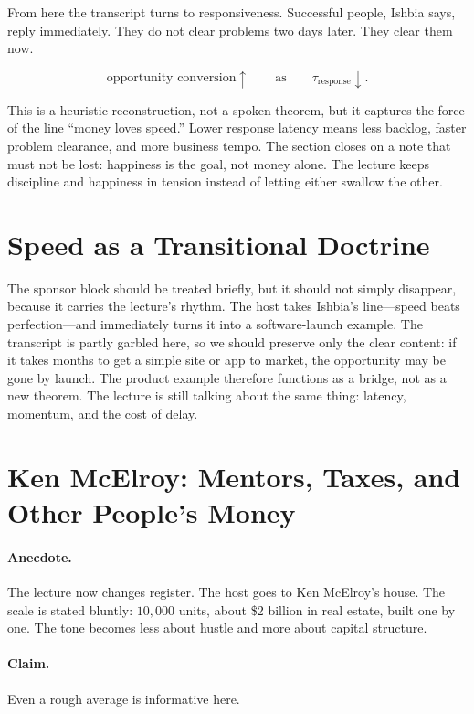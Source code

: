 From here the transcript turns to responsiveness. Successful people, Ishbia says, reply immediately. They do not clear problems two days later. They clear them now.

\begin{equation}
\text{opportunity conversion} \uparrow \qquad \text{as} \qquad \tau_{\text{response}} \downarrow.
\end{equation}

This is a heuristic reconstruction, not a spoken theorem, but it captures the force of the line ``money loves speed.'' Lower response latency means less backlog, faster problem clearance, and more business tempo. The section closes on a note that must not be lost: happiness is the goal, not money alone. The lecture keeps discipline and happiness in tension instead of letting either swallow the other.

\section{Speed as a Transitional Doctrine}

The sponsor block should be treated briefly, but it should not simply disappear, because it carries the lecture's rhythm. The host takes Ishbia's line---speed beats perfection---and immediately turns it into a software-launch example. The transcript is partly garbled here, so we should preserve only the clear content: if it takes months to get a simple site or app to market, the opportunity may be gone by launch. The product example therefore functions as a bridge, not as a new theorem. The lecture is still talking about the same thing: latency, momentum, and the cost of delay.

\section{Ken McElroy: Mentors, Taxes, and Other People's Money}

\paragraph{Anecdote.} The lecture now changes register. The host goes to Ken McElroy's house. The scale is stated bluntly: \(10{,}000\) units, about \$2 billion in real estate, built one by one. The tone becomes less about hustle and more about capital structure.

\paragraph{Claim.} Even a rough average is informative here.

